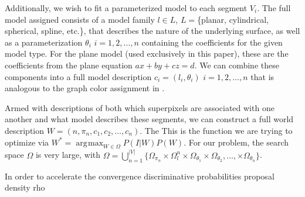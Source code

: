 \documentclass[10pt,letterpaper]{article}
\DeclareMathOperator*{\argmax}{arg\!max}
\begin{document}
	Additionally, we wish to fit a parameterized model to each segment $V_i$. The full model assigned consists of a model family $l\in{L}$,  $L=$\{planar, cylindrical, spherical, spline, etc.\}, that describes the nature of the underlying surface, as well as a parameterization $\theta_i$ $i=1,2,\ldots,n$ containing the coefficients for the given model type. For the plane model (used exclusively in this paper), these are the coefficients from the plane equation $ax+by+cz=d$. We can combine these components into a full model description $c_i=(l_i,\theta_i)$ $i=1,2,\ldots,n$ that is analogous to the graph color assignment in \cite{swendsen1987nonuniversal}.
	
	Armed with descriptions of both which superpixels are associated with one another and what model describes these segments, we can construct a full world description $W=(n,\pi_n,c_1,c_2,\ldots,c_n)$. The  This is the function we are trying to optimize via $W^*={\argmax}_{W\in\Omega} P(I|W)P(W)$. For our problem, the search space $\Omega$ is very large, with $\Omega=\bigcup_{n=1}^{|V|}\{\Omega_{\pi_n} \times\Omega_{l}^n \times\Omega_{\theta_1} \times\Omega_{\theta_2},\ldots, \times\Omega_{\theta_n}\}$.
	
	
	
	
	
	In order to accelerate the convergence
	\cite{barbu2005generalizing}
	discriminative probabilities
	proposal density
	rho
\end{document}
